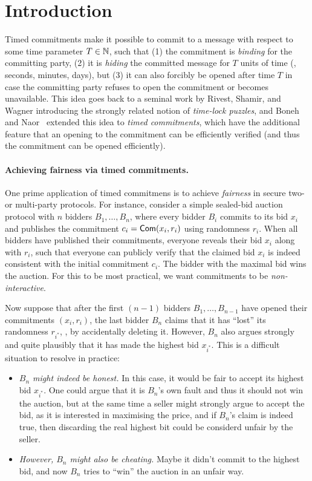\section{Introduction}\label{sec:intro}

Timed commitments make it possible to commit to a message with respect to some time parameter $T \in \mathbb{N}$, such that (1) the commitment is \emph{binding} for the committing party, (2) it is \emph{hiding} the committed message for $T$ units of time (\eg, seconds, minutes, days), but (3) it can also forcibly be opened after time $T$ in case the committing party refuses to open the commitment or becomes unavailable. This idea goes back to a seminal work by Rivest, Shamir, and Wagner \cite{RSW96} introducing the strongly related notion of \emph{time-lock puzzles}, and Boneh and Naor~\cite{C:BonNao00} extended this idea to \emph{timed commitments}, which have the additional feature that an opening to the commitment can be efficiently verified (and thus the commitment can be opened efficiently).

\paragraph{Achieving fairness via timed commitments.}
One prime application of timed commitmens is to achieve \emph{fairness} in secure two- or multi-party protocols. For instance, consider a simple sealed-bid auction protocol with $n$ bidders $B_1, \ldots, B_n$, where every bidder $B_i$ commits to its bid $x_i$ and publishes the commitment $c_i = \mathsf{Com}(x_i,r_i)$ using randomness $r_i$. When all bidders have published their commitments, everyone reveals their bid $x_i$ along with $r_i$, such that everyone can publicly verify that the claimed bid $x_i$ is indeed consistent with the initial commitment $c_i$. The bidder with the maximal bid wins the auction.
For this to be most practical, we want commitments to be \emph{non-interactive}.

Now suppose that after the first $(n-1)$ bidders $B_1, \ldots, B_{n-1}$ have opened their commitments $(x_i, r_i)$, the last bidder $B_n$ claims that it has ``lost'' its randomness $r_{i^*}$, \eg, by accidentally deleting it. However, $B_n$ also argues strongly and quite plausibly that it has made the highest bid $x_{i^*}$. This is a difficult situation to resolve in practice:
\begin{itemize}
	\item \emph{$B_n$ might indeed be honest.} In this case, it would be fair to accept its highest bid $x_{i^*}$. One could argue that it is $B_n$'s own fault and thus it should not win the auction, but at the same time a seller might strongly argue to accept the bid, as it is interested in maximising the price, and if $B_n$'s claim is indeed true, then discarding the real highest bit could be considerd unfair by the seller.
	\item \emph{However, $B_n$ might also be cheating.} Maybe it didn't commit to the highest bid, and now $B_n$ tries to ``win'' the auction in an unfair way.
\end{itemize}

